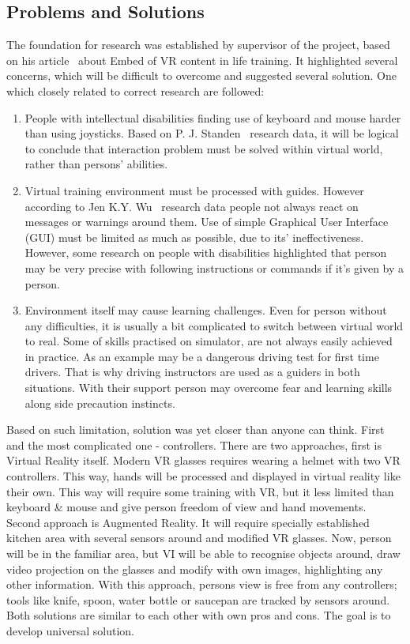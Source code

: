 \documentclass[18pt]{article}
\numberwithin{equation}{section} %
\numberwithin{figure}{section} %
\numberwithin{table}{section} %
\begin{document}
	\subsection{Problems and Solutions}
	The foundation for research was established by supervisor of the project, based on his article~\cite{quteprints100187} about Embed of VR content in life training. It highlighted several concerns, which will be difficult to overcome and suggested several solution. One which closely related to correct research are followed: \\	
	\begin{enumerate}
		\item People with intellectual disabilities finding use of keyboard and mouse harder than using joysticks. Based on P. J. Standen~\cite{control} research data, it will be logical to conclude that interaction problem must be solved within virtual world, rather than persons' abilities.
		\item Virtual training environment must be processed with guides. However according to Jen K.Y. Wu~\cite{WU20058} research data people not always react on messages or warnings around them. Use of simple Graphical User Interface (GUI) must be limited as much as possible, due to its' ineffectiveness. However, some research on people with disabilities highlighted that person may be very precise with following instructions or commands if it's given by a person.
		\item Environment itself may cause learning challenges. Even for person without any difficulties, it is usually a bit complicated to switch between virtual world to real. Some of skills practised on simulator, are not always easily achieved in practice. As an example may be a dangerous driving test for first time drivers. That is why driving instructors are used as a guiders in both situations. With their support person may overcome fear and learning skills along side precaution instincts.
	\end{enumerate}
	Based on such limitation, solution was yet closer than anyone can think. First and the most complicated one - controllers. There are two approaches, first is Virtual Reality itself. Modern VR glasses requires wearing a helmet with two VR controllers. This way, hands will be processed and displayed in virtual reality like their own. This way will require some training with VR, but it less limited than keyboard \& mouse and give person freedom of view and hand movements. \\
	Second approach is Augmented Reality. It will require specially established kitchen area with several sensors around and modified VR glasses. Now, person will be in the familiar area, but VI will be able to recognise objects around, draw video projection on the glasses and modify with own images, highlighting any other information. With this approach, persons view is free from any controllers; tools like knife, spoon, water bottle or saucepan are tracked by sensors around.\\
	Both solutions are similar to each other with own pros and cons. The goal is to develop universal solution. \\
	
\end{document}
